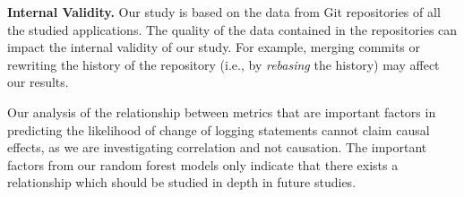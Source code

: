 
\noindent \textbf{Internal Validity.} Our study is based on the data from Git repositories of all the studied applications. The quality of the data contained in the repositories can impact the internal validity of our study. For example, merging commits or rewriting the history of the repository (i.e., by \emph{rebasing} the history) may affect our results.  

Our analysis of the relationship between metrics that are important factors in predicting the likelihood of change of logging statements cannot claim causal effects, as we are investigating correlation and not causation. The important factors from our random forest models only indicate that there exists a relationship which should be studied in depth in future studies. 



